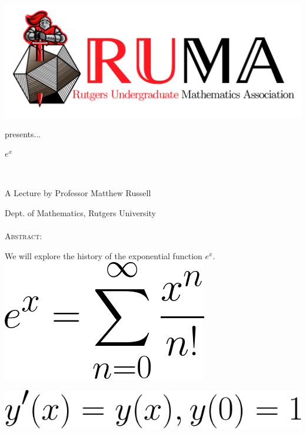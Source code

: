 \documentclass[12pt]{article}
\begin{document}

\begin{center}\includegraphics[scale=.40]{RUMAlogo.png}
  
  presents... 

  \vspace{2mm} 
\begin{spacing}{1}
{\fontsize{40}{44}\selectfont  \textsc{
$e^x$}} \end{spacing}
 

~~\\
\begin{spacing}{1.5}
{\fontsize{24}{24} \selectfont A Lecture by Professor Matthew
  Russell}  \end{spacing}  
\large Dept. of Mathematics, Rutgers University \\~~\\

\normalsize
\textsc{Abstract:}

\Large
We will explore the history of the exponential function $e^x$.
\\

\includegraphics[scale=.45]{CodeCogsEqn.png}

\vspace{2mm} 
\includegraphics[scale=.45]{CodeCogsEqn(1).png}


\end{center}
\end{document}
